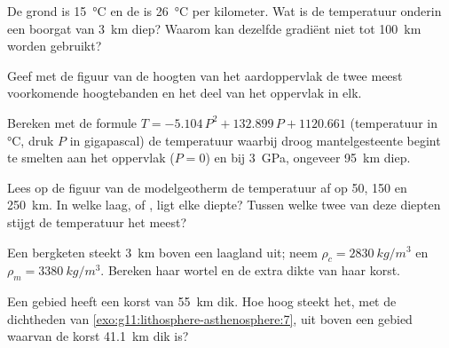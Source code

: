 \begin{exercise}[$\star$]\label{exo:g11:lithosphere-asthenosphere:3}
De grond is \qty{15}{\celsius} en de  is
\qty{26}{\celsius} per kilometer. Wat is de temperatuur onderin een boorgat van
\qty{3}{km} diep? Waarom kan dezelfde gradiënt niet tot \qty{100}{km} worden
gebruikt?
\end{exercise}

\begin{exercise}[$\star$]\label{exo:g11:lithosphere-asthenosphere:4}
Geef met de figuur van de hoogten van het aardoppervlak de twee meest voorkomende
hoogtebanden en het deel van het oppervlak in elk.
\end{exercise}

\begin{exercise}[$\star$]\label{exo:g11:lithosphere-asthenosphere:5}
Bereken met de formule $T = -5.104\,P^2 + 132.899\,P + 1120.661$ (temperatuur in
\unit{\celsius}, druk $P$ in gigapascal) de temperatuur waarbij droog
mantelgesteente begint te smelten aan het oppervlak ($P = 0$) en bij
\qty{3}{GPa}, ongeveer \qty{95}{km} diep.
\end{exercise}

\begin{exercise}[$\star\star$]\label{exo:g11:lithosphere-asthenosphere:6}
Lees op de figuur van de modelgeotherm de temperatuur af op 50, 150 en
\qty{250}{km}. In welke laag,  of , ligt elke diepte?
Tussen welke twee van deze diepten stijgt de temperatuur het meest?
\end{exercise}

\begin{exercise}[$\star\star$]\label{exo:g11:lithosphere-asthenosphere:7}
Een bergketen steekt \qty{3}{km} boven een laagland uit; neem $\rho_c =
\qty{2830}{kg/m^3}$ en $\rho_m = \qty{3380}{kg/m^3}$. Bereken haar wortel en de
extra dikte van haar korst.
\end{exercise}

\begin{exercise}[$\star\star$]\label{exo:g11:lithosphere-asthenosphere:8}
Een gebied heeft een korst van \qty{55}{km} dik. Hoe hoog steekt het, met de
dichtheden van \cref{exo:g11:lithosphere-asthenosphere:7}, uit boven een gebied
waarvan de korst \qty{41.1}{km} dik is?
\end{exercise}

